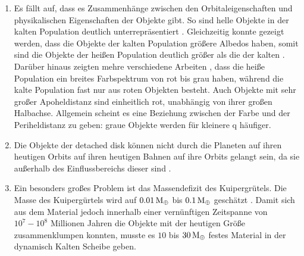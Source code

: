 \documentclass[12pt,a4paper,twoside,open=right,bibliography=totoc]{scrbook}
\renewcommand{\cite}{ \citep}
\newcommand{\ME}{M_\oplus}
\begin{document}
\begin{enumerate}
\item Es fällt auf, dass es Zusammenhänge zwischen den Orbitaleigenschaften und physikalischen Eigenschaften der Objekte gibt. So sind helle Objekte in der kalten Population deutlich unterrepräsentiert\cite{Levison2001a}. Gleichzeitig konnte gezeigt werden, dass die Objekte der kalten Population größere Albedos haben, somit sind die Objekte der heißen Population deutlich größer als die der kalten\cite{Grundy2005}.
Darüber hinaus zeigten mehre verschiedene Arbeiten \cite{Tegler2000,Doressoundiram2001,Trujillo2002,Doressoundiram2005,Elliot2005,Levison2008}, dass die heiße Population ein breites Farbspektrum von rot bis grau haben, während die kalte Population fast nur aus roten Objekten besteht.
Auch Objekte mit sehr großer Apoheldistanz sind einheitlich rot, unabhängig von ihrer großen Halbachse.
Allgemein scheint es eine Beziehung zwischen der Farbe und der Periheldistanz zu geben: graue Objekte werden für kleinere q häufiger.
\item Die Objekte der detached disk können nicht durch die Planeten auf ihren heutigen Orbits auf ihren heutigen Bahnen auf ihre Orbits gelangt sein, da sie außerhalb des Einflussbereichs dieser sind\cite{Levison2008}.
\item Ein besonders großes Problem ist das Massendefizit des Kuipergrütels. Die Masse des Kuipergürtels wird auf $\unit[0.01]{\ME}$ bis $\unit[0.1]{\ME}$ geschätzt\cite{Gladman2001, Bernstein2004, Levison2008}.
Damit sich aus dem Material jedoch innerhalb einer vernünftigen Zeitspanne von $10^7-10^8$ Millionen Jahren die Objekte mit der heutigen Größe zusammenklumpen konnten, musste es $10$ bis $\unit[30]{\ME}$ festes Material in der dynamisch Kalten Scheibe geben.\cite{Stern1996AJ, Stern1997AJ, Stern1997ApJ, Kenyon1998AJ, Kenyon1999AJ, Kenyon1999ApJ, Kenyon2004}
\end{enumerate}
\end{document}
